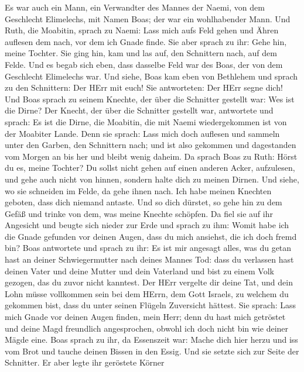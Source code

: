  Es war auch ein Mann, ein Verwandter des Mannes der
Naemi, von dem Geschlecht Elimelechs, mit Namen Boas; der war ein
wohlhabender Mann.  Und Ruth, die Moabitin, sprach zu
Naemi: Lass mich aufs Feld gehen und Ähren auflesen dem nach, vor dem
ich Gnade finde. Sie aber sprach zu ihr: Gehe hin, meine Tochter.
 Sie ging hin, kam und las auf, den Schnittern nach, auf
dem Felde. Und es begab sich eben, dass dasselbe Feld war des Boas, der
von dem Geschlecht Elimelechs war.  Und siehe, Boas kam
eben von Bethlehem und sprach zu den Schnittern: Der HErr mit euch! Sie
antworteten: Der HErr segne dich!  Und Boas sprach zu
seinem Knechte, der über die Schnitter gestellt war: Wes ist die Dirne?
 Der Knecht, der über die Schnitter gestellt war,
antwortete und sprach: Es ist die Dirne, die Moabitin, die mit Naemi
wiedergekommen ist von der Moabiter Lande.  Denn sie
sprach: Lass mich doch auflesen und sammeln unter den Garben, den
Schnittern nach; und ist also gekommen und dagestanden vom Morgen an bis
her und bleibt wenig daheim.  Da sprach Boas zu Ruth:
Hörst du es, meine Tochter? Du sollst nicht gehen auf einen anderen
Acker, aufzulesen, und gehe auch nicht von hinnen, sondern halte dich zu
meinen Dirnen.  Und siehe, wo sie schneiden im Felde, da
gehe ihnen nach. Ich habe meinen Knechten geboten, dass dich niemand
antaste. Und so dich dürstet, so gehe hin zu dem Gefäß und trinke von
dem, was meine Knechte schöpfen.  Da fiel sie auf ihr
Angesicht und beugte sich nieder zur Erde und sprach zu ihm: Womit habe
ich die Gnade gefunden vor deinen Augen, dass du mich ansiehst, die ich
doch fremd bin?  Boas antwortete und sprach zu ihr: Es
ist mir angesagt alles, was du getan hast an deiner Schwiegermutter nach
deines Mannes Tod: dass du verlassen hast deinen Vater und deine Mutter
und dein Vaterland und bist zu einem Volk gezogen, das du zuvor nicht
kanntest.  Der HErr vergelte dir deine Tat, und dein Lohn
müsse vollkommen sein bei dem HErrn, dem Gott Israels, zu welchem du
gekommen bist, dass du unter seinen Flügeln Zuversicht hättest.
 Sie sprach: Lass mich Gnade vor deinen Augen finden,
mein Herr; denn du hast mich getröstet und deine Magd freundlich
angesprochen, obwohl ich doch nicht bin wie deiner Mägde eine.
 Boas sprach zu ihr, da Essenszeit war: Mache dich hier
herzu und iss vom Brot und tauche deinen Bissen in den Essig. Und sie
setzte sich zur Seite der Schnitter. Er aber legte ihr geröstete Körner
